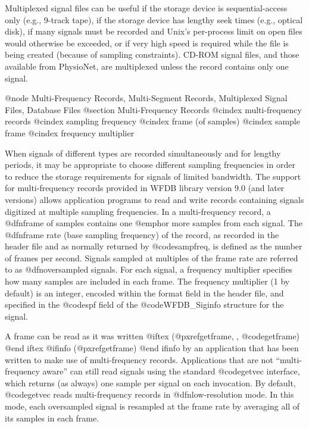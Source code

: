 {{{{{{{{{{Multiplexed signal files can be useful if the storage device is
sequential-access only (e.g., 9-track tape), if the storage device has lengthy
seek times (e.g., optical disk), if many signals must be recorded and Unix's
per-process limit on open files would otherwise be exceeded, or if very high
speed is required while the file is being created (because of sampling
constraints).  CD-ROM signal files, and those available from PhysioNet, are
multiplexed unless the record contains only one signal.

@node     Multi-Frequency Records, Multi-Segment Records, Multiplexed Signal Files, Database Files
@section Multi-Frequency Records
@cindex multi-frequency records
@cindex sampling frequency
@cindex frame (of samples)
@cindex sample frame
@cindex frequency multiplier

When signals of different types are recorded simultaneously and for
lengthy periods, it may be appropriate to choose different sampling
frequencies in order to reduce the storage requirements for signals of
limited bandwidth.  The support for multi-frequency records provided in
WFDB library version 9.0 (and later versions) allows application programs
to read and write records containing signals digitized at multiple
sampling frequencies.  In a multi-frequency record, a @dfn{frame} of
samples contains one @emph{or more} samples from each signal.  The
@dfn{frame rate} (base sampling frequency) of the record, as recorded in the
header file and as normally returned by @code{sampfreq}, is defined as
the number of frames per second.  Signals sampled at multiples of the
frame rate are referred to as @dfn{oversampled signals}.  For each signal, a
frequency multiplier specifies how many samples are included in each
frame.  The frequency multiplier (1 by default) is an integer, encoded
within the format field in the header file, and specified in the
@code{spf} field of the @code{WFDB_Siginfo} structure for the signal.

A frame can be read as it was written
@iftex
(@pxref{getframe, , @code{getframe}})
@end iftex
@ifinfo
(@pxref{getframe})
@end ifinfo
by an application that has been written to make use of multi-frequency
records.  Applications that are not ``multi-frequency aware'' can still
read signals using the standard @code{getvec} interface, which returns
(as always) one sample per signal on each invocation.  By default,
@code{getvec} reads multi-frequency records in @dfn{low-resolution} mode.
In this mode, each oversampled signal is resampled at the frame rate by
averaging all of its samples in each frame.

}}}}}}}}}}
